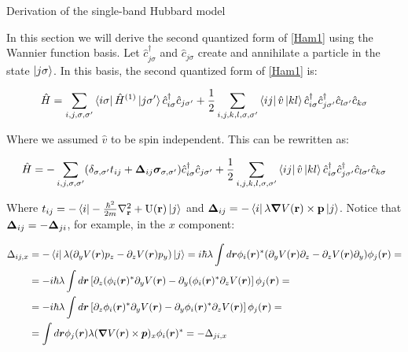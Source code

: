 \begin{section}{Derivation of the single-band Hubbard model}

In this section we will derive the second quantized form of \ref{Ham1} using the Wannier function basis. Let $\hat{c}_{j \sigma}^\dagger$ and $\hat{c}_{j \sigma}$ create and annihilate a particle in the state $\ket{j\sigma}$. In this basis, the second quantized form of \ref{Ham1} is:

\begin{equation}
\hat{H} = \sum_{i,j,\sigma, \sigma'} \bra{i\sigma} \hat{H}^{(1)} \ket{j\sigma'} \hat{c}_{i \sigma}^\dagger \hat{c}_{j \sigma'} + \frac{1}{2} \sum_{i,j,k,l, \sigma, \sigma'} \bra{ij} \hat{v} \ket{kl} \hat{c}_{i \sigma}^\dagger \hat{c}_{j \sigma'}^\dagger \hat{c}_{l \sigma'} \hat{c}_{k \sigma}
\end{equation}

Where we assumed $\hat{v}$ to be spin independent. This can be rewritten as:

\begin{equation}
\hat{H} = -\sum_{i,j,\sigma, \sigma'} (\delta_{\sigma, \sigma'} t_{ij} + \boldsymbol{\Delta}_{ij} \boldsymbol{\sigma}_{\sigma, \sigma'}) \hat{c}_{i \sigma}^\dagger \hat{c}_{j \sigma'} + \frac{1}{2} \sum_{i,j,k,l, \sigma, \sigma'} \bra{ij} \hat{v} \ket{kl} \hat{c}_{i \sigma}^\dagger \hat{c}_{j \sigma'}^\dagger \hat{c}_{l \sigma'} \hat{c}_{k \sigma}
\end{equation}

Where $t_{ij} = -\bra{i} -\frac{\hbar^2}{2m}\nabla^2_{\textbf{r}} + \text{U}(\textbf{r}) \ket{j}$ and $\boldsymbol{\Delta}_{ij} = -\bra{i} \lambda \boldsymbol{\nabla}V(\textbf{r}) \times \textbf{p} \ket{j}$. Notice that $\boldsymbol{\Delta}_{ij} = - \boldsymbol{\Delta}_{ji}$, for example, in the $x$ component:

\begin{align*}
\Delta_{ij,x} &= -\bra{i} \lambda (\partial_y V(\boldsymbol{r}) p_z - \partial_z V(\boldsymbol{r}) p_y) \ket{j} = i \hbar \lambda \int d \boldsymbol{r} \phi_i(\boldsymbol{r})^* (\partial_y V(\boldsymbol{r}) \partial_z - \partial_z V(\boldsymbol{r}) \partial_y) \phi_j(\boldsymbol{r}) = \\
&= -i\hbar\lambda \int d\boldsymbol{r} \left[ \partial_z(\phi_i(\boldsymbol{r})^*\partial_y V(\boldsymbol{r}) - \partial_y(\phi_i(\boldsymbol{r})^*\partial_z V(\boldsymbol{r}) \right] \phi_j(\boldsymbol{r}) = \\
&= -i\hbar\lambda \int d\boldsymbol{r} \left[ \partial_z \phi_i(\boldsymbol{r})^* \partial_y V(\boldsymbol{r}) - \partial_y \phi_i(\boldsymbol{r})^*\partial_z V(\boldsymbol{r}) \right] \phi_j(\boldsymbol{r}) = \\
&= \int d\boldsymbol{r} \phi_j(\boldsymbol{r}) \lambda (\boldsymbol{\nabla}V(\boldsymbol{r}) \times \boldsymbol{p})_x \phi_i(\boldsymbol{r})^* = - \Delta_{ji,x}
\end{align*}


\end{section}
